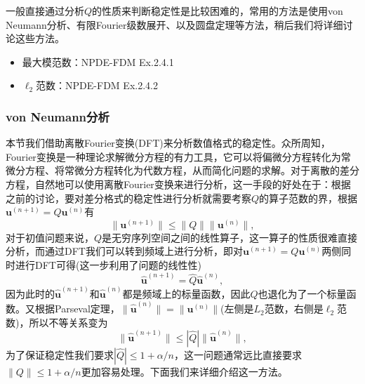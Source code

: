 \documentclass[a4paper,10pt]{ctexart}
\begin{document}
一般直接通过分析$ Q $的性质来判断稳定性是比较困难的，常用的方法是使用von Neumann分析、有限Fourier级数展开、以及圆盘定理等方法，稍后我们将详细讨论这些方法。

\begin{itemize}
    \item 最大模范数：NPDE-FDM Ex.2.4.1
    \item $ \ell_2 $范数：NPDE-FDM Ex.2.4.2
\end{itemize}

\subsubsection{von Neumann分析}
本节我们借助离散Fourier变换(DFT)来分析数值格式的稳定性。众所周知，Fourier变换是一种理论求解微分方程的有力工具，它可以将偏微分方程转化为常微分方程、将常微分方程转化为代数方程，从而简化问题的求解。对于离散的差分方程，自然地可以使用离散Fourier变换来进行分析，这一手段的好处在于：根据之前的讨论，要对差分格式的稳定性进行分析就需要考察$ Q $的算子范数的界，根据$ \bm{u}^{(n+1)} = Q \bm{u}^{(n)} $有
\[
    \| \bm{u}^{(n+1)} \| \leqslant  \| Q \| \| \bm{u}^{(n)} \| ,
\]
对于初值问题来说，$ Q $是无穷序列空间之间的线性算子，这一算子的性质很难直接分析，而通过DFT我们可以转到频域上进行分析，即对$ \bm{u}^{(n+1)} = Q \bm{u}^{(n)} $两侧同时进行DFT可得(这一步利用了问题的线性性)
\begin{equation}
    \hat{\bm{u}}^{(n+1)} = \hat{Q} \hat{\bm{u}}^{(n)},
\end{equation}
因为此时的$ \hat{\bm{u}}^{(n+1)} $和$ \hat{\bm{u}}^{(n)} $都是频域上的标量函数，因此$ \hat{Q} $也退化为了一个标量函数。又根据Parseval定理，$ \| \hat{\bm{u}}^{(n)} \| = \| \bm{u}^{(n)} \| $(左侧是$ L_2 $范数，右侧是$ \ell_2 $范数)，所以不等关系变为
\[
    \| \hat{\bm{u}}^{(n+1)} \| \leqslant  | \hat{Q} | \| \hat{\bm{u}}^{(n)} \| ,
\]
为了保证稳定性我们要求$ |\hat{Q}|\leqslant 1+\alpha / n $，这一问题通常远比直接要求$ \| Q \| \leqslant 1+\alpha / n $更加容易处理。下面我们来详细介绍这一方法。
\end{document}
